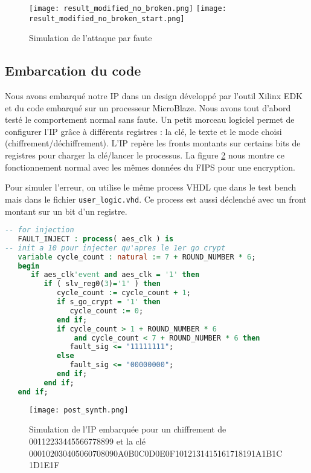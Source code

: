 \begin{figure}[!h]
	\begin{center}
	\texttt{[image: result\_modified\_no\_broken.png]}
	\texttt{[image: result\_modified\_no\_broken\_start.png]}
	\caption{Simulation de l'attaque par faute}
	\label{modified_start}
	\label{modified}
	\end{center}
\end{figure}

\begin{minipage}{\textwidth}
\subsection{Embarcation du code}

Nous avons embarqué notre IP dans un design développé par l'outil Xilinx EDK
et du code embarqué sur un processeur MicroBlaze. Nous avons tout d'abord testé
le comportement normal sans faute. Un petit morceau logiciel permet de configurer
l'IP grâce à différents registres : la clé, le texte et le mode
choisi (chiffrement/déchiffrement). L'IP repère les fronts montants sur certains
bits de registres pour charger la clé/lancer le processus. La figure \ref{post}
nous montre ce fonctionnement normal avec les mêmes données du FIPS pour une encryption.

Pour simuler l'erreur, on utilise le même process VHDL que dans le test bench
mais dans le fichier \texttt{user\_logic.vhd}. Ce process est aussi déclenché
avec un front montant sur un bit d'un registre. 

\begin{lstlisting}[language=VHDL]
-- for injection
   FAULT_INJECT : process( aes_clk ) is
-- init a 10 pour injecter qu'apres le 1er go crypt
   variable cycle_count : natural := 7 + ROUND_NUMBER * 6;
   begin 
      if aes_clk'event and aes_clk = '1' then
         if ( slv_reg0(3)='1' ) then
            cycle_count := cycle_count + 1;
            if s_go_crypt = '1' then
               cycle_count := 0;
            end if;
            if cycle_count > 1 + ROUND_NUMBER * 6 
            	and cycle_count < 7 + ROUND_NUMBER * 6 then
               fault_sig <= "11111111";
            else 
               fault_sig <= "00000000";
            end if;
         end if;
   end if;
\end{lstlisting}

\end{minipage}

\begin{figure}[h!]
	\begin{center}
	\texttt{[image: post\_synth.png]}
	\caption{Simulation de l'IP embarquée pour un chiffrement de 00112233445566778899 et la clé 000102030405060708090A0B0C0D0E0F1012131415161718191A1B1C1D1E1F}
	\label{post}
	\end{center}
\end{figure}

